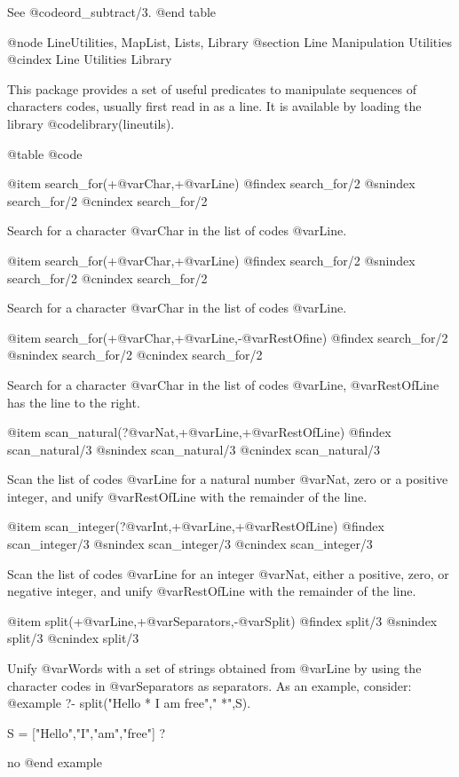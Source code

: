 {{{{{{{{See @code{ord_subtract/3}.
@end table

@node LineUtilities, MapList, Lists, Library
@section Line Manipulation Utilities
@cindex Line Utilities Library

This package provides a set of useful predicates to manipulate
sequences of characters codes, usually first read in as a line. It is
available by loading the library @code{library(lineutils)}.

@table @code

@item search_for(+@var{Char},+@var{Line})
@findex search_for/2
@snindex search_for/2
@cnindex search_for/2

Search for a character @var{Char} in the list of codes @var{Line}.

@item search_for(+@var{Char},+@var{Line})
@findex search_for/2
@snindex search_for/2
@cnindex search_for/2

Search for a character @var{Char} in the list of codes @var{Line}.

@item search_for(+@var{Char},+@var{Line},-@var{RestOfine})
@findex search_for/2
@snindex search_for/2
@cnindex search_for/2

Search for a character @var{Char} in the list of codes @var{Line},
@var{RestOfLine} has the line to the right.

@item scan_natural(?@var{Nat},+@var{Line},+@var{RestOfLine})
@findex scan_natural/3
@snindex scan_natural/3
@cnindex scan_natural/3

Scan the list of codes @var{Line} for a natural number @var{Nat}, zero
or a positive integer, and unify @var{RestOfLine} with the remainder
of the line.

@item scan_integer(?@var{Int},+@var{Line},+@var{RestOfLine})
@findex scan_integer/3
@snindex scan_integer/3
@cnindex scan_integer/3

Scan the list of codes @var{Line} for an integer @var{Nat}, either a
positive, zero, or negative integer, and unify @var{RestOfLine} with
the remainder of the line.

@item split(+@var{Line},+@var{Separators},-@var{Split})
@findex split/3
@snindex split/3
@cnindex split/3

Unify @var{Words} with a set of strings obtained from @var{Line} by
using the character codes in @var{Separators} as separators. As an
example, consider:
@example
?- split("Hello * I am free"," *",S).

S = ["Hello","I","am","free"] ?

no
@end example

}}}}}}}}

